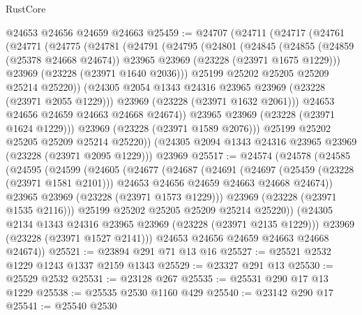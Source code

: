 \begin{lexlean}{RustCore}
\begin{coremodule}
    @24653
    @24656
    @24659
    @24663
@25459 := @24707
    (@24711
      (@24717
        (@24761
          (@24771
            (@24775
              (@24781
                (@24791
                  (@24795
                    (@24801
                      (@24845
                        (@24855
                          (@24859 (@25378 @24668 @24674))
                          @23965
                          @23969
                          (@23228 (@23971 @1675 @1229)))
                        @23969
                        (@23228 (@23971 @1640 @2036)))
                      @25199
                      @25202
                      @25205
                      @25209
                      @25214
                      @25220))
                  (@24305 @2054 @1343 @24316 @23965 @23969 (@23228 (@23971 @2055 @1229)))
                  @23969
                  (@23228 (@23971 @1632 @2061)))
                @24653
                @24656
                @24659
                @24663
                @24668
                @24674))
            @23965
            @23969
            (@23228 (@23971 @1624 @1229)))
          @23969
          (@23228 (@23971 @1589 @2076)))
        @25199
        @25202
        @25205
        @25209
        @25214
        @25220))
    (@24305 @2094 @1343 @24316 @23965 @23969 (@23228 (@23971 @2095 @1229)))
    @23969
@25517 := @24574
    (@24578
      (@24585
        (@24595
          (@24599
            (@24605
              (@24677
                (@24687
                  (@24691
                    (@24697
                      (@25459 (@23228 (@23971 @1581 @2101)))
                      @24653
                      @24656
                      @24659
                      @24663
                      @24668
                      @24674))
                  @23965
                  @23969
                  (@23228 (@23971 @1573 @1229)))
                @23969
                (@23228 (@23971 @1535 @2116)))
              @25199
              @25202
              @25205
              @25209
              @25214
              @25220))
          (@24305 @2134 @1343 @24316 @23965 @23969 (@23228 (@23971 @2135 @1229)))
          @23969
          (@23228 (@23971 @1527 @2141)))
        @24653
        @24656
        @24659
        @24663
        @24668
        @24674))
@25521 := @23894 @291 @71 @13 @16
@25527 := @25521 @2532 @1229 @1243 @1337 @2159 @1343
@25529 := @23327 @291 @13
@25530 := @25529 @2532
@25531 := @23128 @267
@25535 := @25531 @290 @17 @13 @1229
@25538 := @25535 @2530 @1160 @429
@25540 := @23142 @290 @17
@25541 := @25540 @2530

\end{coremodule}
\end{lexlean}

